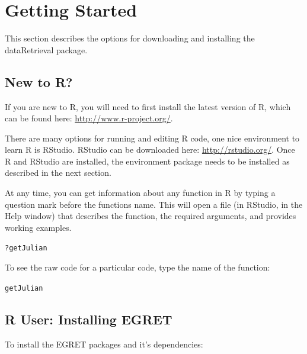 \documentclass[a4paper,11pt]{article}\usepackage[]{graphicx}\usepackage[]{color}
\makeatletter
\newcommand{\hlopt}[1]{\textcolor[rgb]{0,0,0}{#1}}%
\newcommand{\hlstd}[1]{\textcolor[rgb]{0.345,0.345,0.345}{#1}}%
\newenvironment{kframe}{%
 \def\at@end@of@kframe{}%
 \ifinner\ifhmode%
  \def\at@end@of@kframe{\end{minipage}}%
  \begin{minipage}{\columnwidth}%
 \fi\fi%
 \def\FrameCommand##1{\hskip\@totalleftmargin \hskip-\fboxsep
 \colorbox{shadecolor}{##1}\hskip-\fboxsep
     \hskip-\linewidth \hskip-\@totalleftmargin \hskip\columnwidth}%
 \MakeFramed {\advance\hsize-\width
   \@totalleftmargin\z@ \linewidth\hsize
   \@setminipage}}%
 {\par\unskip\endMakeFramed%
 \at@end@of@kframe}
\newenvironment{knitrout}{}{} %
\makeatother
\begin{document}
\section{Getting Started}
\label{sec:appendix1}
This section describes the options for downloading and installing the dataRetrieval package.

\subsection{New to R?}
If you are new to R, you will need to first install the latest version of R, which can be found here: \url{http://www.r-project.org/}.

There are many options for running and editing R code, one nice environment to learn R is RStudio. RStudio can be downloaded here: \url{http://rstudio.org/}. Once R and RStudio are installed, the environment package needs to be installed as described in the next section.

At any time, you can get information about any function in R by typing a question mark before the functions name.  This will open a file (in RStudio, in the Help window) that describes the function, the required arguments, and provides working examples.

\begin{knitrout}
\color{fgcolor}\begin{kframe}
\begin{alltt}
\hlopt{?}\hlstd{getJulian}
\end{alltt}
\end{kframe}
\end{knitrout}


To see the raw code for a particular code, type the name of the function:
\begin{knitrout}
\color{fgcolor}\begin{kframe}
\begin{alltt}
\hlstd{getJulian}
\end{alltt}
\end{kframe}
\end{knitrout}



\subsection{R User: Installing EGRET}
To install the EGRET packages and it's dependencies:
\end{document}
